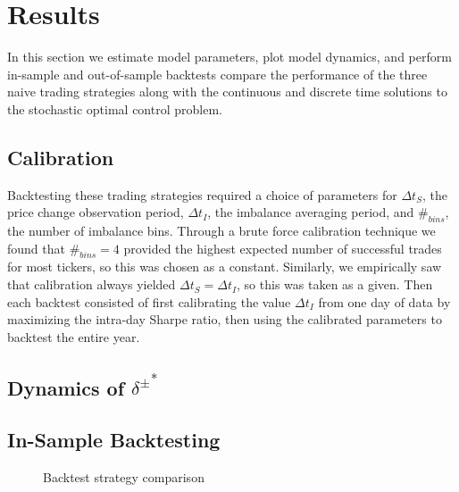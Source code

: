 \chapter{Results}
In this section we estimate model parameters, plot model dynamics, and perform in-sample and out-of-sample backtests compare the performance of the three naive trading strategies along with the continuous and discrete time solutions to the stochastic optimal control problem.

\section{Calibration}

Backtesting these trading strategies required a choice of parameters for $\Delta t_S$, the price change observation period, $\Delta t_I$, the imbalance averaging period, and $\#_{bins}$, the number of imbalance bins. Through a brute force calibration technique we found that $\#_{bins} = 4$ provided the highest expected number of successful trades for most tickers, so this was chosen as a constant. Similarly, we empirically saw that calibration always yielded $\Delta t_S = \Delta t_I$, so this was taken as a given. Then each backtest consisted of first calibrating the value $\Delta t_I$ from one day of data by maximizing the intra-day Sharpe ratio, then using the calibrated parameters to backtest the entire year.

\section{Dynamics of \texorpdfstring{${\delta^{\pm}}^*$}{delta}}

\section{In-Sample Backtesting}

\begin{figure}[H]
  \centering
  \setlength{} 
  \setlength{}
  
  \caption{Backtest strategy comparison}
\end{figure}


